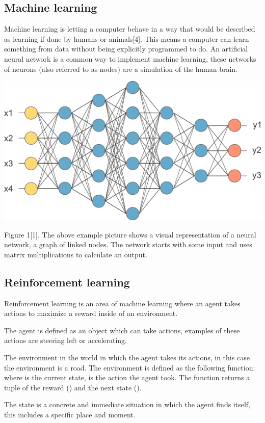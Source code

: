 \documentclass{article}
\begin{document}
\subsection{Machine learning}
Machine learning is letting a computer behave in a way that would be described as learning if done by humans or animals[4]. This means a computer can learn something from data without being explicitly programmed to do. An artificial neural network is a common way to implement machine learning, these networks of neurons (also referred to as nodes) are a simulation of  the human brain. 

\includegraphics[width=\paperwidth]{neural_net}

Figure 1[1]. The above example picture shows a visual representation of a neural network, a graph of linked nodes. The network starts with some input and uses matrix multiplications to calculate an output. 

\subsection{Reinforcement learning}
Reinforcement learning is an area of machine learning where an agent takes actions to maximize a reward inside of an environment. 

The agent is defined as an object which can take actions, examples of these actions are steering left or accelerating. 

The environment in the world in which the agent takes its actions, in this case the environment is a road. The environment is defined as the following function:  where  is the current state,  is the action the agent took. The function returns a tuple of the reward () and the next state ().

The state is a concrete and immediate situation in which the agent finds itself, this includes a specific place and moment.
\end{document}
